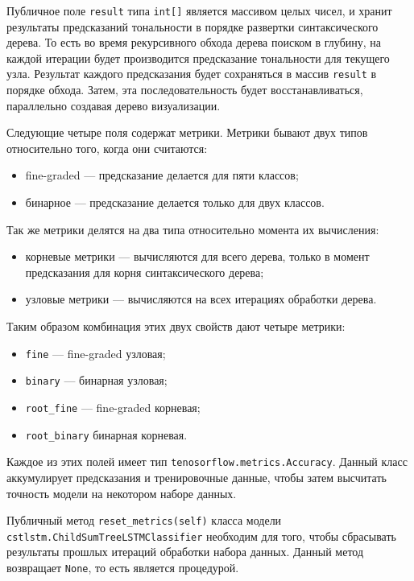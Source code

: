 Публичное поле \texttt{result} типа \texttt{int[]} является массивом целых чисел, и хранит результаты предсказаний тональности в порядке развертки синтаксического дерева. То есть во время рекурсивного обхода дерева поиском в глубину, на каждой итерации будет производится предсказание тональности для текущего узла. Результат каждого предсказания будет сохраняться в массив \texttt{result} в порядке обхода. Затем, эта последовательность будет восстанавливаться, параллельно создавая дерево визуализации.

Следующие четыре поля содержат метрики. Метрики бывают двух типов относительно того, когда они считаются:
\begin{itemize}
\item fine-graded --- предсказание делается для пяти классов;
\item бинарное --- предсказание делается только для двух классов.
\end{itemize}

Так же метрики делятся на два типа относительно момента их вычисления:
\begin{itemize}
\item корневые метрики --- вычисляются для всего дерева, только в момент предсказания для корня синтаксического дерева;
\item узловые метрики --- вычисляются на всех итерациях обработки дерева.
\end{itemize}

Таким образом комбинация этих двух свойств дают четыре метрики:
\begin{itemize}
\item \texttt{fine} --- fine-graded узловая;
\item \texttt{binary} --- бинарная узловая;
\item \texttt{root\_fine} --- fine-graded корневая;
\item \texttt{root\_binary} бинарная корневая.
\end{itemize}

Каждое из этих полей имеет тип \texttt{tenosorflow.metrics.Accura\-cy}. Данный класс аккумулирует предсказания и тренировочные данные, чтобы затем высчитать точность модели на некотором наборе данных.

Публичный метод \texttt{reset\_metrics(self)} класса модели \texttt{cstls\-tm.Child\-Sum\-Tree\-LSTMClassifier} необходим для того, чтобы сбрасывать результаты прошлых итераций обработки набора данных. Данный метод возвращает \texttt{None}, то есть является процедурой.

